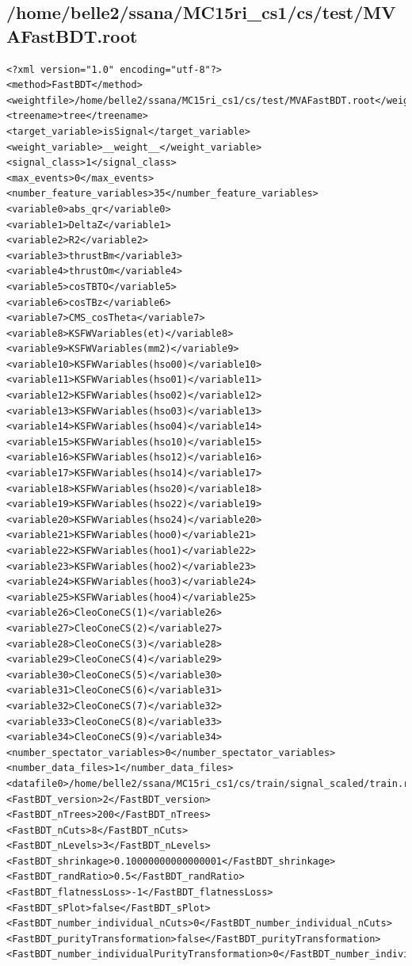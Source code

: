 \documentclass[10pt,a4paper]{article}
\begin{document}
\subsection{/home/belle2/ssana/MC15ri\_cs1/cs/test/MVAFastBDT.root}
\lstset{language=XML}
\begin{lstlisting}[breaklines=true]
<?xml version="1.0" encoding="utf-8"?>
<method>FastBDT</method>
<weightfile>/home/belle2/ssana/MC15ri_cs1/cs/test/MVAFastBDT.root</weightfile>
<treename>tree</treename>
<target_variable>isSignal</target_variable>
<weight_variable>__weight__</weight_variable>
<signal_class>1</signal_class>
<max_events>0</max_events>
<number_feature_variables>35</number_feature_variables>
<variable0>abs_qr</variable0>
<variable1>DeltaZ</variable1>
<variable2>R2</variable2>
<variable3>thrustBm</variable3>
<variable4>thrustOm</variable4>
<variable5>cosTBTO</variable5>
<variable6>cosTBz</variable6>
<variable7>CMS_cosTheta</variable7>
<variable8>KSFWVariables(et)</variable8>
<variable9>KSFWVariables(mm2)</variable9>
<variable10>KSFWVariables(hso00)</variable10>
<variable11>KSFWVariables(hso01)</variable11>
<variable12>KSFWVariables(hso02)</variable12>
<variable13>KSFWVariables(hso03)</variable13>
<variable14>KSFWVariables(hso04)</variable14>
<variable15>KSFWVariables(hso10)</variable15>
<variable16>KSFWVariables(hso12)</variable16>
<variable17>KSFWVariables(hso14)</variable17>
<variable18>KSFWVariables(hso20)</variable18>
<variable19>KSFWVariables(hso22)</variable19>
<variable20>KSFWVariables(hso24)</variable20>
<variable21>KSFWVariables(hoo0)</variable21>
<variable22>KSFWVariables(hoo1)</variable22>
<variable23>KSFWVariables(hoo2)</variable23>
<variable24>KSFWVariables(hoo3)</variable24>
<variable25>KSFWVariables(hoo4)</variable25>
<variable26>CleoConeCS(1)</variable26>
<variable27>CleoConeCS(2)</variable27>
<variable28>CleoConeCS(3)</variable28>
<variable29>CleoConeCS(4)</variable29>
<variable30>CleoConeCS(5)</variable30>
<variable31>CleoConeCS(6)</variable31>
<variable32>CleoConeCS(7)</variable32>
<variable33>CleoConeCS(8)</variable33>
<variable34>CleoConeCS(9)</variable34>
<number_spectator_variables>0</number_spectator_variables>
<number_data_files>1</number_data_files>
<datafile0>/home/belle2/ssana/MC15ri_cs1/cs/train/signal_scaled/train.root</datafile0>
<FastBDT_version>2</FastBDT_version>
<FastBDT_nTrees>200</FastBDT_nTrees>
<FastBDT_nCuts>8</FastBDT_nCuts>
<FastBDT_nLevels>3</FastBDT_nLevels>
<FastBDT_shrinkage>0.10000000000000001</FastBDT_shrinkage>
<FastBDT_randRatio>0.5</FastBDT_randRatio>
<FastBDT_flatnessLoss>-1</FastBDT_flatnessLoss>
<FastBDT_sPlot>false</FastBDT_sPlot>
<FastBDT_number_individual_nCuts>0</FastBDT_number_individual_nCuts>
<FastBDT_purityTransformation>false</FastBDT_purityTransformation>
<FastBDT_number_individualPurityTransformation>0</FastBDT_number_individualPurityTransformation>
\end{lstlisting}\raggedbottom
\pagebreak[0]
\FloatBarrier
\end{document}
